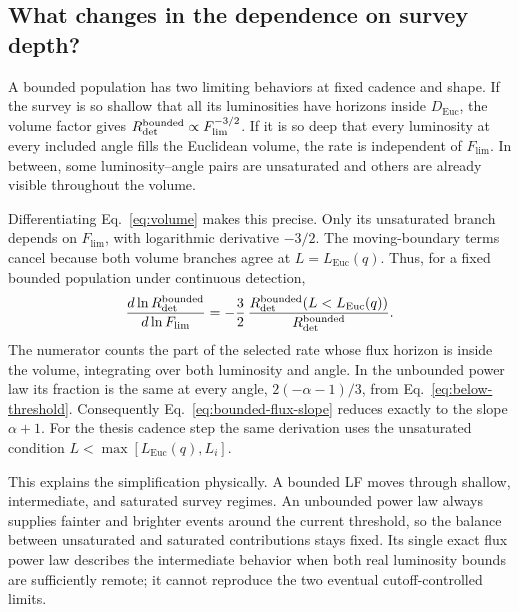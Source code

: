 \documentclass[11pt,a4paper]{article}
\newcommand{\Euc}{\mathrm{Euc}}
\newcommand{\Flim}{F_{\mathrm{lim}}}
\begin{document}
\subsection{What changes in the dependence on survey depth?}
A bounded population has two limiting behaviors at fixed cadence and shape.
If the survey is so shallow that all its luminosities have horizons inside
$D_\Euc$, the volume factor gives $R_{\rm det}^{\rm bounded}\propto\Flim^{-3/2}$.
If it is so deep that every luminosity at every included angle fills the
Euclidean volume, the rate is independent of $\Flim$.
In between, some luminosity--angle pairs are unsaturated and others are
already visible throughout the volume.

Differentiating Eq.~\eqref{eq:volume} makes this precise. Only its unsaturated
branch depends on $\Flim$, with logarithmic derivative $-3/2$.
The moving-boundary terms cancel because both volume branches agree at
$L=L_\Euc(q)$. Thus, for a fixed bounded population under continuous detection,
\begin{equation}
 \frac{d\ln R_{\rm det}^{\rm bounded}}{d\ln\Flim}
 =-\frac32\,
 \frac{R_{\rm det}^{\rm bounded}(L<L_\Euc(q))}
 {R_{\rm det}^{\rm bounded}}.
 \label{eq:bounded-flux-slope}
\end{equation}
The numerator counts the part of the selected rate whose flux horizon is
inside the volume, integrating over both luminosity and angle. In the
unbounded power law its fraction is the same at every angle,
$2(-\alpha-1)/3$, from Eq.~\eqref{eq:below-threshold}. Consequently
Eq.~\eqref{eq:bounded-flux-slope} reduces exactly to the slope $\alpha+1$.
For the thesis cadence step the same derivation uses the unsaturated condition
$L<\max[L_\Euc(q),L_i]$.

This explains the simplification physically. A bounded LF moves through
shallow, intermediate, and saturated survey regimes. An unbounded power law
always supplies fainter and brighter events around the current threshold,
so the balance between unsaturated and saturated contributions stays fixed.
Its single exact flux power law describes the intermediate behavior when
both real luminosity bounds are sufficiently remote; it cannot reproduce
the two eventual cutoff-controlled limits.
\end{document}
